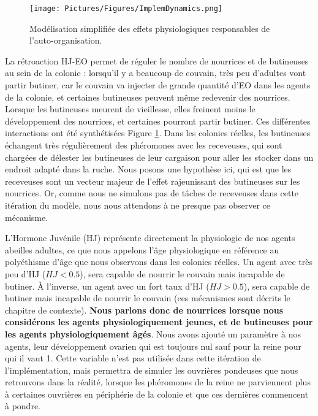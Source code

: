 			
			\begin{figure}
			\centering
			\texttt{[image: Pictures/Figures/ImplemDynamics.png]}
			\caption[Notre modélisation de la physiologie de l'abeille adulte.]{Modélisation simplifiée des effets physiologiques responsables de l'auto-organisation.}
			\label{HJEODynamics}
			\end{figure}
		
		La rétroaction HJ-EO permet de réguler le nombre de nourrices et de butineuses au sein de la colonie : lorsqu'il y a beaucoup de couvain, très peu d'adultes vont partir butiner, car le couvain va injecter de grande quantité d'EO dans les agents de la colonie, et certaines butineuses peuvent même redevenir des nourrices. Lorsque les butineuses meurent de vieillesse, elles freinent moins le développement des nourrices, et certaines pourront partir butiner. Ces différentes interactions ont été synthétisées Figure \ref{HJEODynamics}. Dans les colonies réelles, les butineuses échangent très régulièrement des phéromones avec les receveuses, qui sont chargées de délester les butineuses de leur cargaison pour aller les stocker dans un endroit adapté dans la ruche. Nous posons une hypothèse ici, qui est que les receveuses sont un vecteur majeur de l'effet rajeunissant des butineuses sur les nourrices. Or, comme nous ne simulons pas de tâches de receveuses dans cette itération du modèle, nous nous attendons à ne presque pas observer ce mécanisme.
		
		L'Hormone Juvénile (HJ) représente directement la physiologie de nos agents abeilles adultes, ce que nous appelons l'âge physiologique en référence au polyéthisme d'âge que nous observons dans les colonies réelles. Un agent avec très peu d'HJ ($HJ < 0.5$), sera capable de nourrir le couvain mais incapable de butiner. À l'inverse, un agent avec un fort taux d'HJ ($HJ > 0.5$), sera capable de butiner mais incapable de nourrir le couvain (ces mécanismes sont décrits le chapitre de contexte). \textbf{Nous parlons donc de nourrices lorsque nous considérons les agents physiologiquement jeunes, et de butineuses pour les agents physiologiquement âgés}. Nous avons ajouté un paramètre à nos agents, leur développement ovarien qui est toujours nul sauf pour la reine pour qui il vaut 1. Cette variable n'est pas utilisée dans cette itération de l'implémentation, mais permettra de simuler les ouvrières pondeuses que nous retrouvons dans la réalité, lorsque les phéromones de la reine ne parviennent plus à certaines ouvrières en périphérie de la colonie et que ces dernières commencent à pondre.
		
